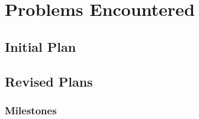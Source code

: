\chapter{Problems Encountered}

\section{Initial Plan}





\section{Revised Plans}





\subsection{Milestones}

\todo


